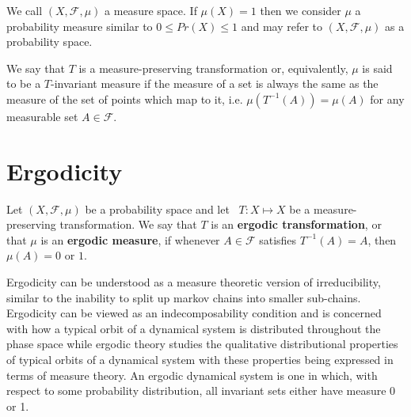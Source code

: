 \documentclass{article}
\begin{document}
We call $(X, \mathcal{F}, \mu)$ a measure space. If $\mu(X) = 1$ then we consider $\mu$ a probability measure similar to $ 0 \leq Pr(X) \leq 1$ and may refer to $(X, \mathcal{F}, \mu)$ as a probability space. 

We say that $T$ is a measure-preserving transformation
or, equivalently, $\mu$ is said to be a $T$-invariant measure if the measure of a set is always the same as the measure of the set of points which map to it, i.e. $\mu(T^{-1}(A))=\mu(A)$ for any measurable set $A \in \mathcal{F}$.


\section{Ergodicity}

Let $(X, \mathcal{F}, \mu)$ be a probability space and let \ $T : X \mapsto X$ be a measure-preserving transformation. We say that $T$ is an \textbf{ergodic transformation}, or that $\mu$ is an \textbf{ergodic measure}, if whenever $A \in \mathcal{F}$ satisfies $T ^{-1}(A) = A$, then $\mu(A) = 0$ or $1$.

Ergodicity can be understood as a measure theoretic version of irreducibility, similar to the inability to split up markov chains into smaller sub-chains. Ergodicity can be viewed as an indecomposability condition and is concerned with how a typical orbit of a dynamical system is distributed throughout the phase space while ergodic theory studies the qualitative distributional properties of typical orbits of a dynamical system with these properties being expressed in terms of measure theory. An ergodic dynamical system is one in which, with respect to some probability distribution, all invariant sets either have measure 0 or 1.
\end{document}
